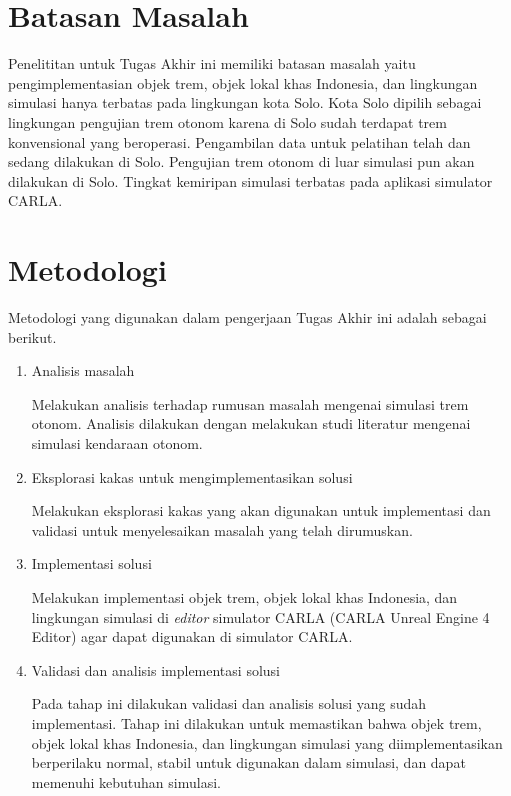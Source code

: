 \section{Batasan Masalah}

Penelititan untuk Tugas Akhir ini memiliki batasan masalah yaitu
pengimplementasian objek trem, objek lokal khas Indonesia, dan lingkungan
simulasi hanya terbatas pada lingkungan kota Solo. Kota Solo dipilih sebagai
lingkungan pengujian trem otonom karena di Solo sudah terdapat trem konvensional
yang beroperasi. Pengambilan data untuk pelatihan telah dan sedang dilakukan di
Solo. Pengujian trem otonom di luar simulasi pun akan dilakukan di Solo.
Tingkat kemiripan simulasi terbatas pada aplikasi simulator CARLA.

\section{Metodologi}

Metodologi yang digunakan dalam pengerjaan Tugas Akhir ini adalah sebagai
berikut.

\begin{enumerate}

	\item Analisis masalah

	Melakukan analisis terhadap rumusan masalah mengenai simulasi trem otonom.
	Analisis dilakukan dengan melakukan studi literatur mengenai simulasi
	kendaraan otonom.

	\item Eksplorasi kakas untuk mengimplementasikan solusi

	Melakukan eksplorasi kakas yang akan digunakan untuk implementasi dan
	validasi untuk menyelesaikan masalah yang telah dirumuskan.

	\item Implementasi solusi

	Melakukan implementasi objek trem, objek lokal khas Indonesia, dan
	lingkungan simulasi di \textit{editor} simulator CARLA (CARLA Unreal Engine
	4 Editor) agar dapat digunakan di simulator CARLA.

	\item Validasi dan analisis implementasi solusi

	Pada tahap ini dilakukan validasi dan analisis solusi yang sudah
	implementasi. Tahap ini dilakukan untuk memastikan bahwa objek trem, objek
	lokal khas Indonesia, dan lingkungan simulasi yang diimplementasikan
	berperilaku normal, stabil untuk digunakan dalam simulasi, dan dapat
	memenuhi kebutuhan simulasi.

\end{enumerate}

